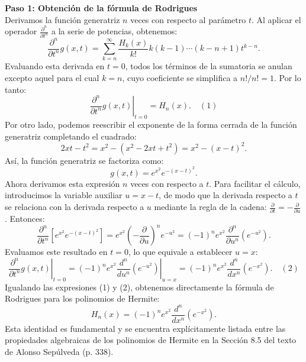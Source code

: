 \documentclass[a4paper]{article}
\begin{document}
\vspace{0.3cm}
\noindent\textbf{Paso 1: Obtención de la fórmula de Rodrigues} \\
Derivamos la función generatriz $n$ veces con respecto al parámetro $t$. Al aplicar el operador $\frac{\partial^n}{\partial t^n}$ a la serie de potencias, obtenemos:
$$
\frac{\partial^n}{\partial t^n} g(x, t) = \sum_{k=n}^{\infty} \frac{H_k(x)}{k!} k(k-1)\cdots(k-n+1) t^{k-n}.
$$
Evaluando esta derivada en $t=0$, todos los términos de la sumatoria se anulan excepto aquel para el cual $k=n$, cuyo coeficiente se simplifica a $n!/n! = 1$. Por lo tanto:
$$
\left. \frac{\partial^n}{\partial t^n} g(x, t) \right|_{t=0} = H_n(x). \quad (1)
$$
Por otro lado, podemos reescribir el exponente de la forma cerrada de la función generatriz completando el cuadrado:
$$
2xt - t^2 = x^2 - (x^2 - 2xt + t^2) = x^2 - (x-t)^2.
$$
Así, la función generatriz se factoriza como:
$$
g(x, t) = e^{x^2} e^{-(x-t)^2}.
$$
Ahora derivamos esta expresión $n$ veces con respecto a $t$. Para facilitar el cálculo, introducimos la variable auxiliar $u = x - t$, de modo que la derivada respecto a $t$ se relaciona con la derivada respecto a $u$ mediante la regla de la cadena: $\frac{\partial}{\partial t} = -\frac{\partial}{\partial u}$. Entonces:
$$
\frac{\partial^n}{\partial t^n} \left[ e^{x^2} e^{-(x-t)^2} \right] = e^{x^2} \left( -\frac{\partial}{\partial u} \right)^n e^{-u^2} = (-1)^n e^{x^2} \frac{\partial^n}{\partial u^n} \left( e^{-u^2} \right).
$$
Evaluamos este resultado en $t=0$, lo que equivale a establecer $u=x$:
$$
\left. \frac{\partial^n}{\partial t^n} g(x, t) \right|_{t=0} = (-1)^n e^{x^2} \left. \frac{d^n}{du^n} \left( e^{-u^2} \right) \right|_{u=x} = (-1)^n e^{x^2} \frac{d^n}{dx^n} \left( e^{-x^2} \right). \quad (2)
$$
Igualando las expresiones (1) y (2), obtenemos directamente la fórmula de Rodrigues para los polinomios de Hermite:
$$
H_n(x) = (-1)^n e^{x^2} \frac{d^n}{dx^n} \left( e^{-x^2} \right).
$$
Esta identidad es fundamental y se encuentra explícitamente listada entre las propiedades algebraicas de los polinomios de Hermite en la Sección 8.5 del texto de Alonso Sepúlveda (p. 338).
\end{document}
